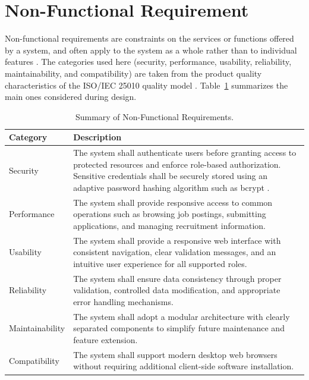 \section{Non-Functional Requirement}

Non-functional requirements are constraints on the services or functions offered by a system, and often apply to the system as a whole rather than to individual features \cite{sommerville2016software}. The categories used here (security, performance, usability, reliability, maintainability, and compatibility) are taken from the product quality characteristics of the ISO/IEC 25010 quality model \cite{iso25010}. Table~\ref{tab:non-functional-requirements} summarizes the main ones considered during design.

\begin{table}[H]
	\centering
	\caption{Summary of Non-Functional Requirements.}
	\label{tab:non-functional-requirements}
	\begin{tabular}{|p{4cm}|p{10cm}|}
		\hline
		\textbf{Category} & \textbf{Description} \\
		\hline
		
		Security &
		The system shall authenticate users before granting access to protected resources and enforce role-based authorization. Sensitive credentials shall be securely stored using an adaptive password hashing algorithm such as bcrypt \cite{provos1999bcrypt, owasp_password_storage}. \\
		\hline
		
		Performance &
		The system shall provide responsive access to common operations such as browsing job postings, submitting applications, and managing recruitment information. \\
		\hline
		
		Usability &
		The system shall provide a responsive web interface with consistent navigation, clear validation messages, and an intuitive user experience for all supported roles. \\
		\hline
		
		Reliability &
		The system shall ensure data consistency through proper validation, controlled data modification, and appropriate error handling mechanisms. \\
		\hline
		
		Maintainability &
		The system shall adopt a modular architecture with clearly separated components to simplify future maintenance and feature extension. \\
		\hline
		
		Compatibility &
		The system shall support modern desktop web browsers without requiring additional client-side software installation. \\
		\hline
		
	\end{tabular}
\end{table}

